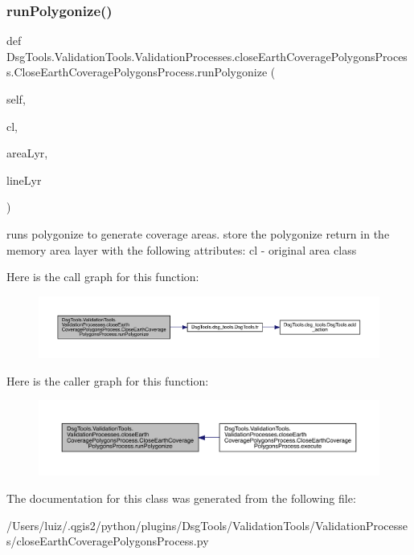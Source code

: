 \subsubsection{\texorpdfstring{run\+Polygonize()}{runPolygonize()}}
{\footnotesize\ttfamily def Dsg\+Tools.\+Validation\+Tools.\+Validation\+Processes.\+close\+Earth\+Coverage\+Polygons\+Process.\+Close\+Earth\+Coverage\+Polygons\+Process.\+run\+Polygonize (\begin{DoxyParamCaption}\item[{}]{self,  }\item[{}]{cl,  }\item[{}]{area\+Lyr,  }\item[{}]{line\+Lyr }\end{DoxyParamCaption})}

\begin{DoxyVerb}runs polygonize to generate coverage areas.
store the polygonize return in the memory area layer with the following attributes:
cl - original area class
\end{DoxyVerb}
 Here is the call graph for this function\+:
\nopagebreak
\begin{figure}[H]
\begin{center}
\leavevmode
\includegraphics[width=350pt]{class_dsg_tools_1_1_validation_tools_1_1_validation_processes_1_1close_earth_coverage_polygons_pcbfc5684de655aabbd7cec48624aa747_a0dc6b96d13793375ed2e8f3e2d9e93f2_cgraph}
\end{center}
\end{figure}
Here is the caller graph for this function\+:
\nopagebreak
\begin{figure}[H]
\begin{center}
\leavevmode
\includegraphics[width=350pt]{class_dsg_tools_1_1_validation_tools_1_1_validation_processes_1_1close_earth_coverage_polygons_pcbfc5684de655aabbd7cec48624aa747_a0dc6b96d13793375ed2e8f3e2d9e93f2_icgraph}
\end{center}
\end{figure}


The documentation for this class was generated from the following file\+:\begin{DoxyCompactItemize}
\item 
/\+Users/luiz/.\+qgis2/python/plugins/\+Dsg\+Tools/\+Validation\+Tools/\+Validation\+Processes/close\+Earth\+Coverage\+Polygons\+Process.\+py\end{DoxyCompactItemize}
